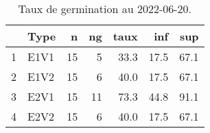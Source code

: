 \begin{table}[ht]
\centering
\begin{tabular}{rlrrrrr}
  \hline
 & Type & n & ng & taux & inf & sup \\ 
  \hline
1 & E1V1 & 15 &  5 & 33.3 & 17.5 & 67.1 \\ 
  2 & E1V2 & 15 &  6 & 40.0 & 17.5 & 67.1 \\ 
  3 & E2V1 & 15 & 11 & 73.3 & 44.8 & 91.1 \\ 
  4 & E2V2 & 15 &  6 & 40.0 & 17.5 & 67.1 \\ 
   \hline
\end{tabular}
\caption{Taux de germination au 2022-06-20.} 
\label{tabtauxG}
\end{table}
